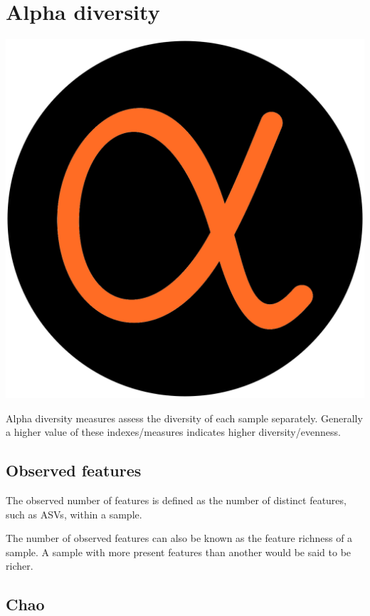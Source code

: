 \documentclass[
]{book}
\begin{document}
\hypertarget{alpha_appendix}{%
\section{Alpha diversity}\label{alpha_appendix}}

\includegraphics{figures/alpha.png}

Alpha diversity measures assess the diversity of each sample separately. Generally a higher value of these indexes/measures indicates higher diversity/evenness.

\hypertarget{obvs}{%
\subsection{Observed features}\label{obvs}}

The observed number of features is defined as the number of distinct features, such as ASVs, within a sample.

The number of observed features can also be known as the feature richness of a sample. A sample with more present features than another would be said to be richer.

\hypertarget{chao}{%
\subsection{Chao}\label{chao}}
\end{document}
